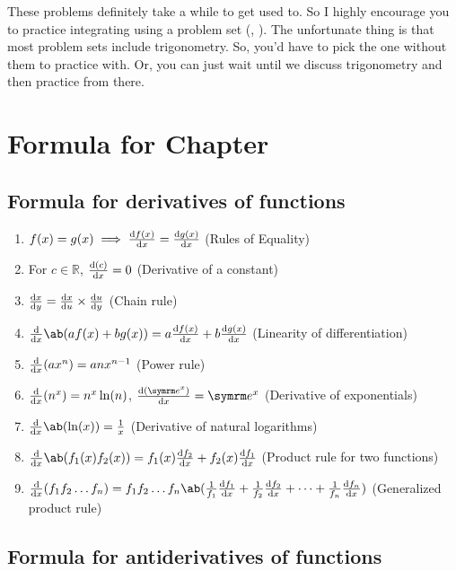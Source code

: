 These problems definitely take a while to get used to. So I highly encourage you to practice integrating using a problem set (\cite{alkousa-2023}, \cite{foster-no-date}). The unfortunate thing is that most problem sets include trigonometry. So, you'd have to pick the one without them to practice with. Or, you can just wait until we discuss trigonometry and then practice from there.

\section{Formula for Chapter \thechapter}

\everymath{\displaystyle}
\subsection{Formula for derivatives of functions}

\begin{enumerate}
  \item $f(x) = g(x) \implies \odv{f(x)}{x} = \odv{g(x)}{x}$ (Rules of Equality)
  \item For $c \in \mathbb{R}$, $\odv{(c)}{x} = 0$ (Derivative of a constant)
  \item $\odv{x}{y} = \odv{x}{u} \times \odv{u}{y}$ (Chain rule)
  \item $\odv*{\ab(af(x) + bg(x))}{x} = a\odv{f(x)}{x} + b\odv{g(x)}{x}$ (Linearity of differentiation)
  \item $\odv*{(ax^n)}{x} = anx^{n - 1}$ (Power rule)
  \item $\odv*{(n^x)}{x} = n^x\ln(n)$, $\odv{(\e^x)}{x} = \e^x$ (Derivative of exponentials)
  \item $\odv*{\ab(\ln(x))}{x} = \frac{1}{x}$ (Derivative of natural logarithms)
  \item $\odv*{\ab(f_1(x)f_2(x))}{x} = f_1(x)\odv{f_2}{x} + f_2(x)\odv{f_1}{x}$ (Product rule for two functions)
  \item $\odv*{(f_1f_2\dots f_n)}{x} = f_1f_2\dots f_n\ab(\frac{1}{f_1}\odv{f_1}{x} + \frac{1}{f_2}\odv{f_2}{x} + \dots + \frac{1}{f_n}\odv{f_n}{x})$ (Generalized product rule)
\end{enumerate}

\subsection{Formula for antiderivatives of functions}

